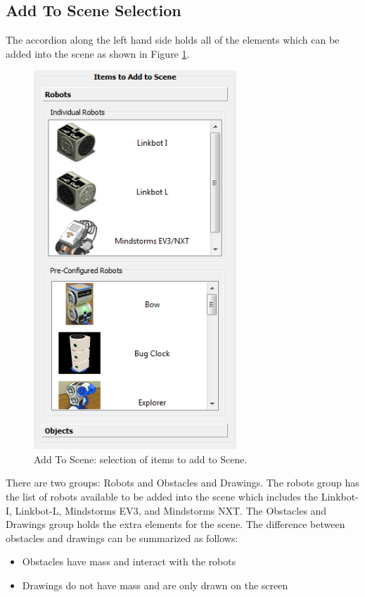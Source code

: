 \documentclass{article}
\begin{document}
\subsection{Add To Scene Selection}
The accordion along the left hand side holds all of the elements which can be
added into the scene as shown in Figure \ref{fig:add}.
\begin{figure}[H]
	\begin{center}
		\includegraphics[width=3in]{pictures/gui_add}
	\end{center}
	\caption{Add To Scene: selection of items to add to Scene.}
	\label{fig:add}
\end{figure}
There are two groups: Robots and Obstacles and Drawings.  The robots group has
the list of robots available to be added into the scene which includes the
Linkbot-I, Linkbot-L, Mindstorms EV3, and Mindstorms NXT.  The Obstacles and
Drawings group holds the extra elements  for the scene.  The difference between
obstacles and drawings can be summarized as follows:
\begin{itemize}
	\item Obstacles have mass and interact with the robots
	\item Drawings do not have mass and are only drawn on the screen
\end{itemize}
\end{document}
